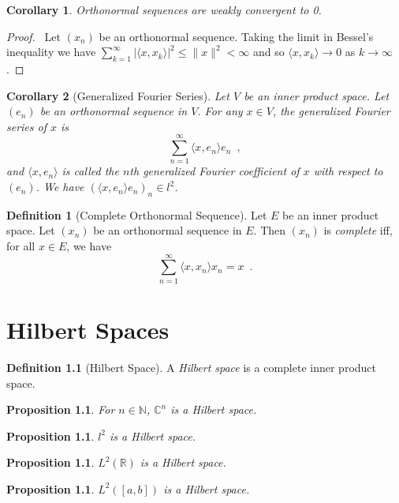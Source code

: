 \documentclass{book}
\let\qed\relax
\newtheorem{prop}[ax]{Proposition}
\newtheorem{cor}{Corollary}[ax]
\theoremstyle{definition}
\newtheorem{df}[ax]{Definition}
\begin{document}
\begin{cor}
Orthonormal sequences are weakly convergent to 0.
\end{cor}

\begin{proof}
\pf\ Let $(x_n)$ be an orthonormal sequence.
Taking the limit in Bessel's inequality we have $\sum_{k=1}^\infty |\langle x, x_k \rangle|^2 \leq \|x\|^2 < \infty$ and so $\langle x, x_k \rangle \rightarrow 0$ as $k \rightarrow \infty$. \qed
\end{proof}

\begin{cor}[Generalized Fourier Series]
Let $V$ be an inner product space. Let $(e_n)$ be an orthonormal sequence in $V$. For any $x \in V$, the \emph{generalized Fourier series} of $x$ is
\[ \sum_{n=1}^\infty \langle x, e_n \rangle e_n \enspace , \]
and $\langle x, e_n \rangle$ is called the $n$th \emph{generalized Fourier coefficient} of $x$ with respect to $(e_n)$.
We have $(\langle x, e_n \rangle e_n)_n \in l^2$.
\end{cor}

\begin{df}[Complete Orthonormal Sequence]
Let $E$ be an inner product space. Let $(x_n)$ be an orthonormal sequence in $E$. Then $(x_n)$ is \emph{complete} iff, for all $x \in E$, we have
\[ \sum_{n=1}^\infty \langle x, x_n \rangle x_n = x \enspace . \]
\end{df}

\chapter{Hilbert Spaces}

\begin{df}[Hilbert Space]
A \emph{Hilbert space} is a complete inner product space.
\end{df}

\begin{prop}
For $n \in \mathbb{N}$, $\mathbb{C}^n$ is a Hilbert space.
\end{prop}

\begin{prop}
$l^2$ is a Hilbert space.
\end{prop}

\begin{prop}
$L^2(\mathbb{R})$ is a Hilbert space.
\end{prop}

\begin{prop}
$L^2([a,b])$ is a Hilbert space.
\end{prop}
\end{document}
